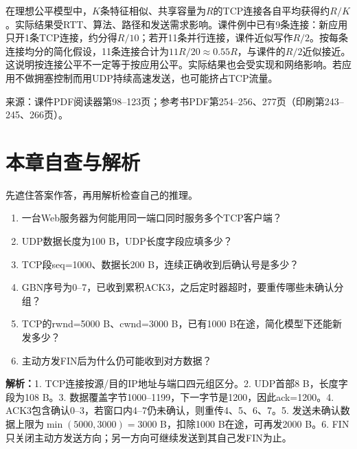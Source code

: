 在理想公平模型中，$K$条特征相似、共享容量为$R$的TCP连接各自平均获得约$R/K$。实际结果受RTT、算法、路径和发送需求影响。课件例中已有9条连接：新应用只开1条TCP连接，约分得$R/10$；若开11条并行连接，课件近似写作$R/2$。按每条连接均分的简化假设，11条连接合计为$11R/20\approx0.55R$，与课件的$R/2$近似接近。这说明按连接公平不一定等于按应用公平。实际结果也会受实现和网络影响。若应用不做拥塞控制而用UDP持续高速发送，也可能挤占TCP流量。

\annotationarea[4]
\small 来源：课件PDF阅读器第98--123页；参考书PDF第254--256、277页（印刷第243--245、266页）。\normalsize

\section*{本章自查与解析}
先遮住答案作答，再用解析检查自己的推理。
\begin{enumerate}[nosep]
\item 一台Web服务器为何能用同一端口同时服务多个TCP客户端？
\item UDP数据长度为100 B，UDP长度字段应填多少？
\item TCP段seq=1000、数据长200 B，连续正确收到后确认号是多少？
\item GBN序号为0--7，已收到累积ACK3，之后定时器超时，要重传哪些未确认分组？
\item TCP的rwnd=5000 B、cwnd=3000 B，已有1000 B在途，简化模型下还能新发多少？
\item 主动方发FIN后为什么仍可能收到对方数据？
\end{enumerate}
\textbf{解析：}1. TCP连接按源/目的IP地址与端口四元组区分。2. UDP首部8 B，长度字段为108 B。3. 数据覆盖字节1000--1199，下一字节是1200，因此ack=1200。4. ACK3包含确认0--3，若窗口内4--7仍未确认，则重传4、5、6、7。5. 发送未确认数据上限为$\min(5000,3000)=3000$ B，扣除1000 B在途，可再发2000 B。6. FIN只关闭主动方发送方向；另一方向可继续发送到其自己发FIN为止。
\annotationarea[4]

